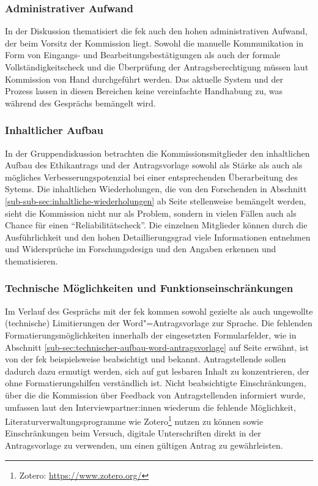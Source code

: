 \documentclass[a4paper,12pt,twoside,numbers=noendperiod]{scrreprt}
\begin{document}
\subsubsection*{Administrativer Aufwand}
\label{sub-sub-sec:administrativer-aufwand}

In der Diskussion thematisiert die \ac{fek} auch den hohen administrativen Aufwand, der beim Vorsitz der Kommission liegt. Sowohl die manuelle Kommunikation in Form von Eingangs- und Bearbeitungsbestätigungen als auch der formale Vollständigkeitscheck und die Überprüfung der Antragsberechtigung müssen laut Kommission von Hand durchgeführt werden. Das aktuelle System und der Prozess lassen in diesen Bereichen keine vereinfachte Handhabung zu, was während des Gesprächs bemängelt wird.

\subsubsection*{Inhaltlicher Aufbau}
\label{sub-sub-sec:inhaltlicher-aufbau}

In der Gruppendiskussion betrachten die Kommissionsmitglieder den inhaltlichen Aufbau des Ethikantrags und der Antragsvorlage sowohl als Stärke als auch als mögliches Verbesserungspotenzial bei einer entsprechenden Überarbeitung des Sytems. Die inhaltlichen Wiederholungen, die von den Forschenden in Abschnitt \ref{sub-sub-sec:inhaltliche-wiederholungen} ab Seite \pageref{sub-sub-sec:inhaltliche-wiederholungen} stellenweise bemängelt werden, sieht die Kommission nicht nur als Problem, sondern in vielen Fällen auch als Chance für einen \enquote{Reliabilitätscheck}. Die einzelnen Mitglieder können durch die Ausführlichkeit und den hohen Detaillierungsgrad viele Informationen entnehmen und Widersprüche im Forschungsdesign und den Angaben erkennen und thematisieren.

\subsubsection*{Technische Möglichkeiten und Funktionseinschränkungen }
\label{sub-sub-sec:möglichkeiten-funktionseinschränkungen}

Im Verlauf des Gesprächs mit der \acl{fek} kommen sowohl gezielte als auch ungewollte (technische) Limitierungen der Word"=Antragsvorlage zur Sprache. Die fehlenden Formatierungsmöglichkeiten innerhalb der eingesetzten Formularfelder, wie in Abschnitt \ref{sub-sec:technischer-aufbau-word-antragsvorlage} auf Seite \pageref{sub-sec:technischer-aufbau-word-antragsvorlage} erwähnt, ist von der \ac{fek} beispielsweise beabsichtigt und bekannt. Antragstellende sollen dadurch dazu ermutigt werden, sich auf gut lesbaren Inhalt zu konzentrieren, der ohne Formatierungshilfen verständlich ist. Nicht beabsichtigte Einschränkungen, über die die Kommission über Feedback von Antragstellenden informiert wurde, umfassen laut den Interviewpartner:innen wiederum die fehlende Möglichkeit, Literaturverwaltungsprogramme wie Zotero\footnote{Zotero: \url{https://www.zotero.org/}} nutzen zu können sowie Einschränkungen beim Versuch, digitale Unterschriften direkt in der Antragsvorlage zu verwenden, um einen gültigen Antrag zu gewährleisten.
\end{document}
